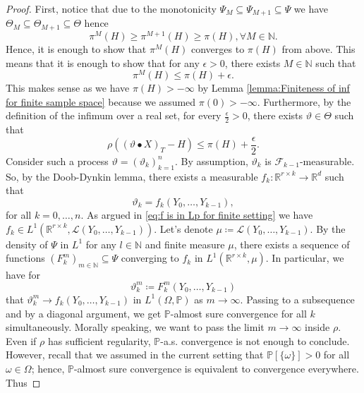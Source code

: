 \documentclass[11pt,a4paper,twoside,openany]{report}
\numberwithin{equation}{section}
\theoremstyle{plain} %
\theoremstyle{definition} %
\theoremstyle{remark} %
\begin{document}
\begin{proof}
 First, notice that due to the monotonicity \(\Psi_M\subseteq\Psi_{M+1}\subseteq\Psi\) we have \(\Theta_M\subseteq\Theta_{M+1}\subseteq\Theta\) hence 
 \begin{equation*}
     \pi^M(H)\geq\pi^{M+1}(H)\geq\pi(H),\forall M\in\mathbb{N}.
 \end{equation*}
 Hence, it is enough to show that \(\pi^M(H)\) converges to \(\pi(H)\) from above. This means that it is enough to show that for any \(\epsilon>0\), there exists \(M\in\mathbb{N}\) such that 
 \begin{equation*}
     \pi^M(H)\leq \pi(H)+\epsilon.
 \end{equation*}
 This makes sense as we have \(\pi(H)>-\infty\) by Lemma \ref{lemma:Finiteness of inf for finite sample space} because we assumed \(\pi(0)>-\infty\).
 Furthermore, by the definition of the infimum over a real set, for every \(\frac{\epsilon}{2}>0\), there exists \(\vartheta\in\Theta\) such that
 \begin{equation*}
     \rho((\vartheta\bullet X)_T-H)\leq\pi(H)+\frac{\epsilon}{2}.
 \end{equation*}
 Consider such a process \(\vartheta=(\vartheta_k)_{k=1}^n\). By assumption, \(\vartheta_k\) is \(\mathcal{F}_{k-1}\)-measurable. So, by the Doob-Dynkin lemma, there exists a measurable \(f_k:\mathbb{R}^{r\times k}\to\mathbb{R}^d\) such that 
 \begin{equation*}
     \vartheta_k=f_k(Y_0,\dots,Y_{k-1}),
 \end{equation*}
 for all \(k=0,\dots,n\). As argued in \eqref{eq:f is in Lp for finite setting} we have \(f_k\in L^1(\mathbb{R}^{r\times k},\mathcal{L}(Y_0,\dots,Y_{k-1}))\). Let's denote \(\mu\coloneqq\mathcal{L}(Y_0,\dots,Y_{k-1})\). By the density of \(\Psi\) in \(L^1\) for any \(l\in\mathbb{N}\) and finite measure \(\mu\), there exists a sequence of functions \((F_k^m)_{m\in\mathbb{N}}\subseteq \Psi\) converging to \(f_k\) in \(L^1(\mathbb{R}^{r\times k},\mu)\). In particular, we have for 
 \begin{equation*}
     \vartheta_{k}^m\coloneqq F_{k}^m(Y_0,\dots,Y_{k-1})
 \end{equation*}
 that \(\vartheta_{k}^m\to f_k(Y_0,\dots,Y_{k-1})\) in \(L^1(\Omega,\mathbb{P})\) as \(m\to\infty\). Passing to a subsequence and by a diagonal argument, we get \(\mathbb{P}\)-almost sure convergence for all \(k\) simultaneously. Morally speaking, we want to pass the limit \(m\to\infty\) inside \(\rho\). Even if \(\rho\) has sufficient regularity, \(\mathbb{P}\)-a.s. convergence is not enough to conclude. However, recall that we assumed in the current setting that \(\mathbb{P}[\{\omega\}]>0\) for all \(\omega\in\Omega\); hence, \(\mathbb{P}\)-almost sure convergence is equivalent to convergence everywhere. Thus

\end{proof}
\end{document}
